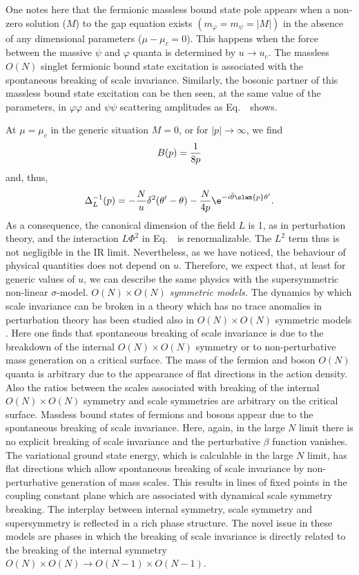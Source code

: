 One notes here that the fermionic massless bound state pole
appears when a non-zero solution  ($M$) to the gap equation exists
$ (m_\varphi=m_\psi=|M|) $ in the absence of any dimensional
parameters ($\mu-\mu_c=0$).  This happens  when the force between
the massive $\psi$ and $ \varphi$ quanta is determined by $u \to
u_c$. The massless $O(N)$ singlet fermionic bound state excitation
is associated with the spontaneous breaking of scale invariance.
Similarly, the bosonic partner of this massless bound state
excitation can be then seen, at the same value of the parameters,
in $\varphi\varphi$ and $\psi\psi$ scattering amplitudes as
  Eq.~\eLLprop~shows.
\par
At $\mu=\mu_c$ in the generic situation $M=0$, or for
$|p|\to\infty$, we find
$$B(p)={1\over 8p} $$
and, thus,
$$\Delta^{-1}_L(p)=-{N\over u}\delta^2(\theta'-\theta)
-{N\over4 p}\e^{-i \bar\theta \slam{p}\theta'}. $$
As a consequence,
the canonical dimension of the field $L$ is 1, as in
perturbation theory, and the interaction $L\Phi^2$ in Eq.~\eactLagm\
is renormalizable. The $L^2$ term thus is not negligible in the IR limit.
Nevertheless,  as we have noticed, the behaviour of physical quantities
does not depend on $u$. Therefore, we expect that, at least for generic values of $u$, we can describe the same physics with the supersymmetric non-linear $\sigma $-model.
\medskip
{\it $O(N)\times O(N)$ symmetric models.} The dynamics by which
scale invariance can be broken in a theory which has no trace
anomalies in perturbation theory has been studied also in
$O(N)\times O(N)$ symmetric models .
Here one finds that
spontaneous breaking of scale invariance is due to the breakdown
of the internal $O(N)\times O(N)$ symmetry or to non-perturbative mass
generation on a critical surface. The mass of the fermion
 and boson $O(N)$ quanta is arbitrary due to
the appearance of flat directions in the action density. Also the ratios
between the scales associated with breaking of the internal
$O(N)\times O(N)$ symmetry and scale
symmetries are arbitrary on the critical surface.
Massless bound states of fermions and bosons appear
due to the spontaneous breaking of scale invariance.
Here, again, in the large $N$ limit there is no explicit breaking of scale
invariance and the perturbative $\beta$ function vanishes.
The variational ground state energy, which is calculable in the
large $N$ limit, has flat directions which allow spontaneous breaking of
scale invariance by non-perturbative generation of mass scales.
This results in lines of fixed points in the
coupling constant plane which are
associated with dynamical scale symmetry
breaking. The interplay between internal symmetry, scale symmetry
and supersymmetry is reflected in a rich phase structure.
The novel issue in these models are phases in which
the breaking of scale invariance is directly related
to the breaking of the internal symmetry
$O(N)\times O(N) \rightarrow  O(N-1)\times O(N-1)$.

